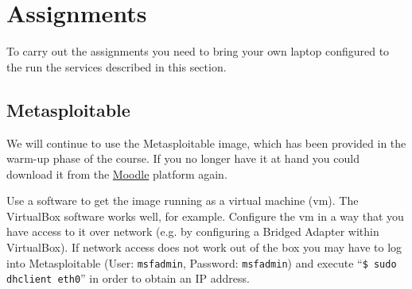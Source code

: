 \documentclass{report}
\makeatletter
\renewcommand{\paragraph}{
  \@startsection{paragraph}{4}
    {\z@}{1.25ex \@plus 1ex \@minus .2ex}{-1em}
      {\normalfont\normalsize\bfseries}
      }
\makeatother
\begin{document}

\section{Assignments}

To carry out the assignments you need to bring your own laptop configured
to the run the services described in this section.

\subsection{Metasploitable}
We will continue to use the Metasploitable image, which has been provided 
in the warm-up phase of the course. If you no longer have it at hand you
could download it from the 
\href{https://moodle.uni-ulm.de/course/view.php?id=1312}{Moodle} platform
again. 

Use a software  to get the image running as a virtual machine (vm). 
The VirtualBox software works well, for example. Configure the vm in a way 
that you have access to it over network (e.g. by configuring a Bridged 
Adapter within VirtualBox). If network access does not work out of the box 
you may have to log into Metasploitable (User: \texttt{msfadmin}, Password:
\texttt{msfadmin}) and execute ``\texttt{\$ sudo dhclient eth0}'' in order
to obtain an IP address.
\end{document}
